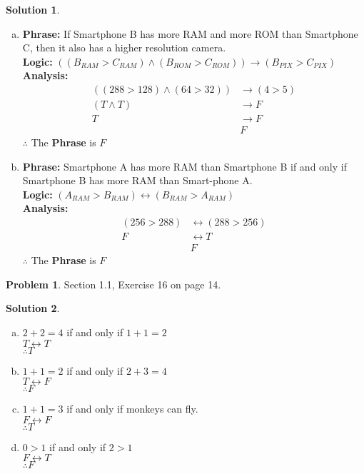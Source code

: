 \documentclass{article}
\theoremstyle{definition}
\newtheorem{problem}{Problem}
\newtheorem*{solution}{Solution}
\begin{document}
\begin{solution}
\begin{enumerate}[(a)]
      \item \textbf{Phrase:} If Smartphone B has more RAM and more ROM than Smartphone C, then it also has a higher resolution camera.\\
        \textbf{Logic:} $((B_{RAM} > C_{RAM}) \land (B_{ROM} > C_{ROM})) \rightarrow (B_{PIX} > C_{PIX})$ \\
        \textbf{Analysis:} 
        \begin{align*}
          ((288 > 128) \wedge (64 > 32)) &\rightarrow (4 > 5) \\
          (T \land T) &\rightarrow F \\
          T &\rightarrow F \\
          &F
        \end{align*}
        $\therefore$ The \textbf{Phrase} is $F$
        
      \item \textbf{Phrase:} Smartphone A has more RAM than Smartphone B if and only if Smartphone B has more RAM than Smart-phone A. \\
        \textbf{Logic:} $(A_{RAM} > B_{RAM}) \leftrightarrow  (B_{RAM} > A_{RAM})$ \\
        \textbf{Analysis:} 
        \begin{align*}
          (256 > 288) &\leftrightarrow (288 > 256) \\
          F &\leftrightarrow T\\
          &F
        \end{align*}
        $\therefore$ The \textbf{Phrase} is $F$
        
    \end{enumerate}
\end{solution}

\begin{problem} Section 1.1, Exercise 16 on page 14.
\end{problem}
\begin{solution} \ \\
\begin{enumerate}[(a)]
  \item $2 + 2 = 4$ if and only if $1 + 1 = 2$ \\
  $T \leftrightarrow T$ \\
  $\therefore T$
  
  \item $1 + 1 = 2$ if and only if $2 + 3 = 4$ \\
  $T \leftrightarrow F$ \\
  $\therefore F$
  
  \item $1 + 1 = 3$ if and only if monkeys can fly. \\
  $F \leftrightarrow F$ \\
  $\therefore T$
  
  \item $ 0 > 1$ if and only if $2 > 1$ \\
  $F \leftrightarrow T$ \\
  $\therefore F$
\end{enumerate}
\end{solution}
\end{document}
